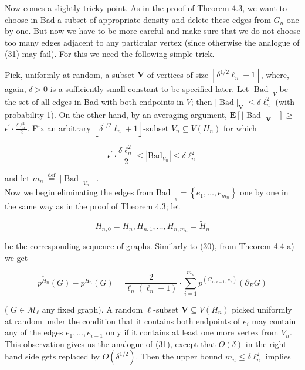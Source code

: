 \documentclass[10pt]{article}
\begin{document}
Now comes a slightly tricky point. As in the proof of Theorem 4.3, we want to choose in Bad a subset of appropriate density and delete these edges from $G_{n}$ one by one. But now we have to be more careful and make sure that we do not choose too many edges adjacent to any particular vertex (since otherwise the analogue of (31) may fail). For this we need the following simple trick.

Pick, uniformly at random, a subset $\boldsymbol{V}$ of vertices of size $\left\lfloor\delta^{1 / 2} \ell_{n}+1\right\rfloor$, where, again, $\delta>0$ is a sufficiently small constant to be specified later. Let $\left.\operatorname{Bad}\right|_{V}$ be the set of all edges in Bad with both endpoints in $V$; then $|\operatorname{Bad}|_{\boldsymbol{V}} \mid \leq \delta \ell_{n}^{2}$ (with probability 1). On the other hand, by an averaging argument, $\mathbf{E}\left[\mid\right.$ Bad $\left.\left.\right|_{\boldsymbol{V}} \mid\right] \geq$ $\epsilon^{\prime} \cdot \frac{\delta \ell_{n}^{2}}{2}$. Fix an arbitrary $\left\lfloor\delta^{1 / 2} \ell_{n}+1\right\rfloor$-subset $V_{n} \subseteq V\left(H_{n}\right)$ for which

$$
\epsilon^{\prime} \cdot \frac{\delta \ell_{n}^{2}}{2} \leq\left|\mathrm{Bad}_{V_{n}}\right| \leq \delta \ell_{n}^{2}
$$

and let $m_{n} \stackrel{\text { def }}{=}|\operatorname{Bad}|_{V_{n}} \mid$.\\
Now we begin eliminating the edges from Bad $_{\left.\right|_{n}}=\left\{e_{1}, \ldots, e_{m_{n}}\right\}$ one by one in the same way as in the proof of Theorem 4.3; let

$$
H_{n, 0}=H_{n}, H_{n, 1}, \ldots, H_{n, m_{n}}=\widetilde{H}_{n}
$$

be the corresponding sequence of graphs. Similarly to (30), from Theorem 4.4 a) we get

$$
p^{\widetilde{H}_{n}}(G)-p^{H_{n}}(G)=\frac{2}{\ell_{n}\left(\ell_{n}-1\right)} \cdot \sum_{i=1}^{m_{n}} p^{\left(G_{n, i-1}, e_{i}\right)}\left(\partial_{E} G\right)
$$

( $G \in \mathcal{M}_{\ell}$ any fixed graph). A random $\ell$-subset $\boldsymbol{V} \subseteq V\left(H_{n}\right)$ picked uniformly at random under the condition that it contains both endpoints of $e_{i}$ may contain any of the edges $e_{1}, \ldots, e_{i-1}$ only if it contains at least one more vertex from $V_{n}$. This observation gives us the analogue of (31), except that $O(\delta)$ in the right-hand side gets replaced by $O\left(\delta^{1 / 2}\right)$. Then the upper bound $m_{n} \leq \delta \ell_{n}^{2}$ implies
\end{document}
